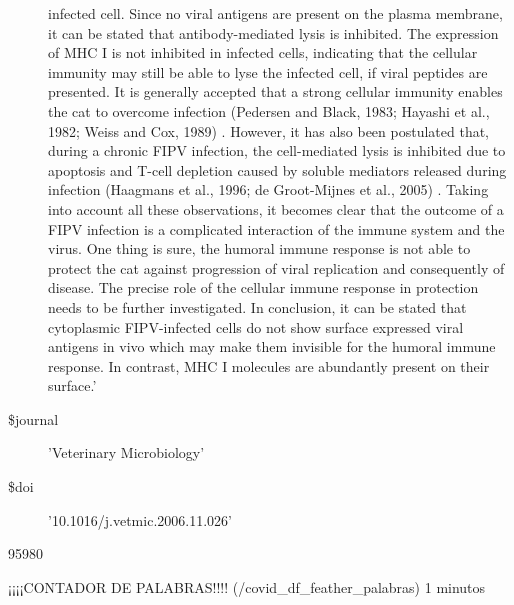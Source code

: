 \documentclass[11pt]{article}
\begin{document}
\begin{description}
infected cell. Since no viral antigens are present on the plasma membrane, it can be stated that antibody-mediated lysis is inhibited. The expression of MHC I is not inhibited in infected cells, indicating that the cellular immunity may still be able to lyse the infected cell, if viral peptides are presented. It is generally accepted that a strong cellular immunity enables the cat to overcome infection (Pedersen and Black, 1983; Hayashi et al., 1982; Weiss and Cox, 1989) . However, it has also been postulated that, during a chronic FIPV infection, the cell-mediated lysis is inhibited due to apoptosis and T-cell depletion caused by soluble mediators released during infection (Haagmans et al., 1996; de Groot-Mijnes et al., 2005) . Taking into account all these observations, it becomes clear that the outcome of a FIPV infection is a complicated interaction of the immune system and the virus. One thing is sure, the humoral immune response is not able to protect the cat against progression of viral replication and consequently of disease. The precise role of the cellular immune response in protection needs to be further investigated. In conclusion, it can be stated that cytoplasmic FIPV-infected cells do not show surface expressed viral antigens in vivo which may make them invisible for the humoral immune response. In contrast, MHC I molecules are abundantly present on their surface.'
\item[\$journal] 'Veterinary Microbiology'
\item[\$doi] '10.1016/j.vetmic.2006.11.026'
\end{description}


    
    95980

    
    ¡¡¡¡CONTADOR DE PALABRAS!!!! (/covid\_df\_feather\_palabras) 1 minutos
\end{document}
